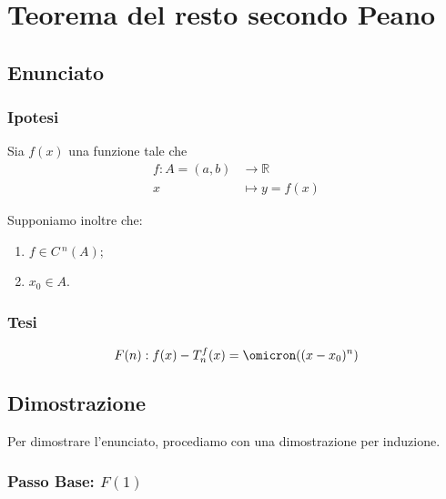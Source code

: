 \documentclass[../dimostrazioni]{subfiles}
\begin{document}
    \chapter{Teorema del resto secondo Peano}
    \label{teoPeano}

        \section*{Enunciato}

            \subsection*{Ipotesi}

                Sia \(f(x)\) una funzione tale che
                \begin{align*}
                    f : A = (a, b) &\longrightarrow \mathbb{R}\\
                    x &\longmapsto y = f(x) 
                \end{align*}

                Supponiamo inoltre che:

                \begin{enumerate}
                    \indentitem \item \(f \in C\,^n(A) \);
                    \indentitem \item \(x_0 \in A\).
                \end{enumerate}

            \subsection*{Tesi}

                \[F(n): f(x) - T _n ^ f (x) = \omicron ((x-x_0)^n) \]

        \section*{Dimostrazione}

        Per dimostrare l'enunciato, procediamo con una dimostrazione per induzione.

        \medskip

        \subsection*{Passo Base: \(F(1)\)}
\end{document}
